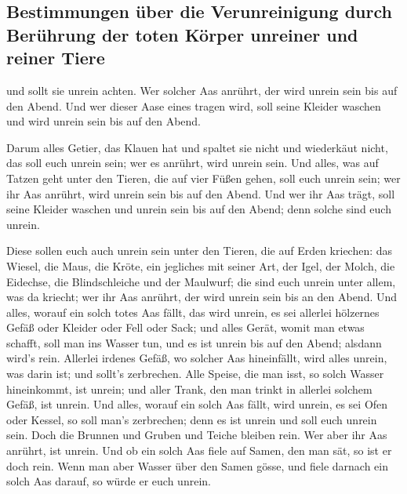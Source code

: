 \hypertarget{bestimmungen-uxfcber-die-verunreinigung-durch-beruxfchrung-der-toten-kuxf6rper-unreiner-und-reiner-tiere}{%
\subsection{Bestimmungen über die Verunreinigung durch Berührung der
toten Körper unreiner und reiner
Tiere}\label{bestimmungen-uxfcber-die-verunreinigung-durch-beruxfchrung-der-toten-kuxf6rper-unreiner-und-reiner-tiere}}

 und sollt sie unrein achten. Wer solcher Aas anrührt,
der wird unrein sein bis auf den Abend.  Und wer dieser
Aase eines tragen wird, soll seine Kleider waschen und wird unrein sein
bis auf den Abend.

 Darum alles Getier, das Klauen hat und spaltet sie nicht
und wiederkäut nicht, das soll euch unrein sein; wer es anrührt, wird
unrein sein.  Und alles, was auf Tatzen geht unter den
Tieren, die auf vier Füßen gehen, soll euch unrein sein; wer ihr Aas
anrührt, wird unrein sein bis auf den Abend.  Und wer ihr
Aas trägt, soll seine Kleider waschen und unrein sein bis auf den Abend;
denn solche sind euch unrein.

 Diese sollen euch auch unrein sein unter den Tieren, die
auf Erden kriechen: das Wiesel, die Maus, die Kröte, ein jegliches mit
seiner Art,  der Igel, der Molch, die Eidechse, die
Blindschleiche und der Maulwurf;  die sind euch unrein
unter allem, was da kriecht; wer ihr Aas anrührt, der wird unrein sein
bis an den Abend.  Und alles, worauf ein solch totes Aas
fällt, das wird unrein, es sei allerlei hölzernes Gefäß oder Kleider
oder Fell oder Sack; und alles Gerät, womit man etwas schafft, soll man
ins Wasser tun, und es ist unrein bis auf den Abend; alsdann wird's
rein.  Allerlei irdenes Gefäß, wo solcher Aas
hineinfällt, wird alles unrein, was darin ist; und sollt's zerbrechen.
 Alle Speise, die man isst, so solch Wasser hineinkommt,
ist unrein; und aller Trank, den man trinkt in allerlei solchem Gefäß,
ist unrein.  Und alles, worauf ein solch Aas fällt, wird
unrein, es sei Ofen oder Kessel, so soll man's zerbrechen; denn es ist
unrein und soll euch unrein sein.  Doch die Brunnen und
Gruben und Teiche bleiben rein. Wer aber ihr Aas anrührt, ist unrein.
 Und ob ein solch Aas fiele auf Samen, den man sät, so
ist er doch rein.  Wenn man aber Wasser über den Samen
gösse, und fiele darnach ein solch Aas darauf, so würde er euch unrein.

